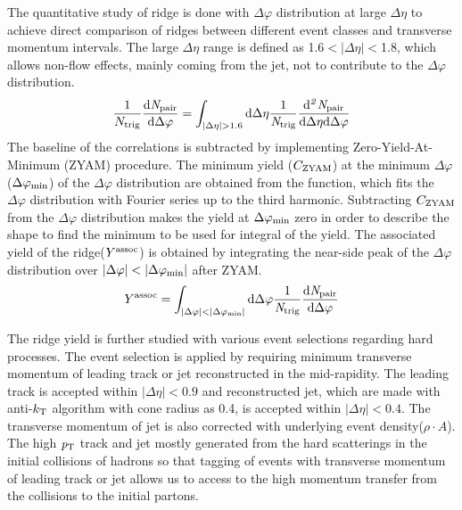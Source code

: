 The quantitative study of ridge is done with $\Delta\varphi$ distribution at large $\Delta\eta$ to achieve direct comparison of ridges between different event classes and transverse momentum intervals. The large $\Delta\eta$ range is defined as 1.6$<|\Delta\eta|<$1.8, which allows non-flow effects, mainly coming from the jet, not to contribute to the $\Delta\varphi$ distribution.
\begin{eqnarray}
\frac{1}{N_{\rm{trig}}} \frac{ \rm{d}\it{}N_{\rm{pair}} }{ \rm{d}\Delta\varphi } = \int_{|\Delta \eta|>1.6} \rm{d} \Delta \eta \frac{1}{\it{N}_{\rm{trig}}} \frac{ \rm{d}\it{}^{2} N_{\rm{pair}} }{ \rm{d}\Delta\eta \rm{d}\Delta\varphi}
\end{eqnarray}
The baseline of the correlations is subtracted by implementing Zero-Yield-At-Minimum (ZYAM) procedure. The minimum yield ($C_{\rm{ZYAM}}$) at the minimum $\Delta\varphi$($\Delta\varphi_{\rm{min}}$) of the $\Delta\varphi$ distribution are obtained from the function, which fits the $\Delta\varphi$ distribution with Fourier series up to the third harmonic. Subtracting $C_{\rm{ZYAM}}$ from the $\Delta\varphi$ distribution makes the yield at $\Delta\varphi_{\rm{min}}$ zero in order to describe the shape to find the minimum to be used for integral of the yield. The associated yield of the ridge($Y^{\rm{assoc}}$) is obtained by integrating the near-side peak of the $\Delta\varphi$ distribution over $|\Delta\varphi|<|\Delta\varphi_{\rm{min}}|$ after ZYAM.
\begin{eqnarray}
Y^{\rm{assoc}} = \int_{|\Delta \varphi| < |\Delta\varphi_{\rm{min}}| } \rm{d} \Delta\varphi \frac{1}{\it{N}_{\rm{trig}}} \frac{ \rm{d}\it{}N_{\rm{pair}} }{ \rm{d}\Delta\varphi } 
\end{eqnarray}

The ridge yield is further studied with various event selections regarding hard processes. The event selection is applied by requiring minimum transverse momentum of leading track or jet reconstructed in the mid-rapidity. The leading track is accepted within $|\Delta\eta|<0.9$ and reconstructed jet, which are made with anti-$k_{\rm{T}}$ algorithm with cone radius as 0.4, is accepted within $|\Delta\eta|<0.4$. The transverse momentum of jet is also corrected with underlying event density($\rho \cdot A$). The high $\it{p}_{\rm{T}}$ track and jet mostly generated from the hard scatterings in the initial collisions of hadrons so that tagging of events with transverse momentum of leading track or jet allows us to access to the high momentum transfer from the collisions to the initial partons.

